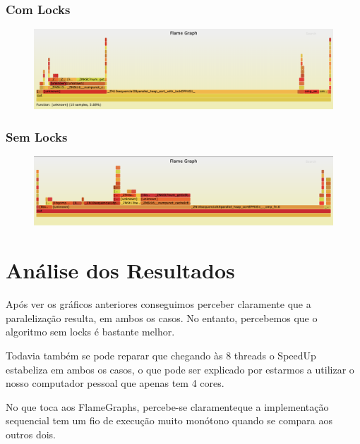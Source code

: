 \documentclass{article}
\begin{document}
\newpage
\subsubsection{Com Locks}
\begin{figure}[!htb]
  \centering
  \includegraphics[width=.9\linewidth]{clocks.png}
\end{figure}

\subsubsection{Sem Locks}
\begin{figure}[!htb]
  \centering
  \includegraphics[width=.9\linewidth]{slocks.png}
\end{figure}

\section{Análise dos Resultados}
\par Após ver os gráficos anteriores conseguimos perceber claramente que a paralelização resulta, em ambos os casos. No entanto, percebemos que o algoritmo sem locks é bastante melhor.
\par Todavia também se pode reparar que chegando às 8 threads o SpeedUp estabeliza em ambos os casos, o que pode ser explicado por estarmos a utilizar o nosso computador pessoal que apenas tem 4 cores.
\par No que toca aos FlameGraphs, percebe-se claramenteque a implementação sequencial tem um fio de execução muito monótono quando se compara aos outros dois.
\end{document}
